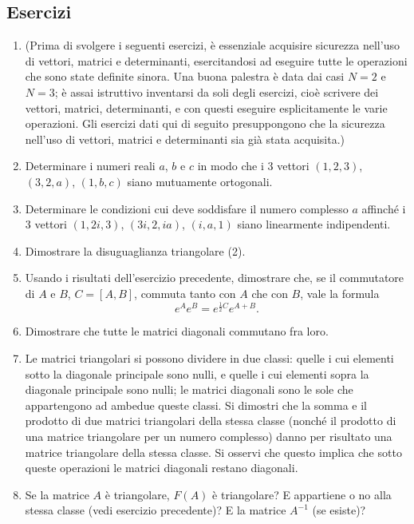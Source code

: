 \documentclass[11pt, a4paper]{book}
\numberwithin{equation}{section}
\newenvironment{esercizi}{\subsection*{Esercizi}\begin{enumerate}}{\end{enumerate}}
\begin{document}
\begin{esercizi}

\item[] (Prima di svolgere i seguenti esercizi, è essenziale acquisire sicurezza nell'uso di vettori, matrici e determinanti, esercitandosi ad eseguire tutte le operazioni che sono state definite sinora. Una buona palestra è data dai casi $N=2$ e $N=3$; è assai istruttivo inventarsi da soli degli esercizi, cioè scrivere dei vettori, matrici, determinanti, e con questi eseguire esplicitamente le varie operazioni. Gli esercizi dati qui di seguito presuppongono che la sicurezza nell'uso di vettori, matrici e determinanti sia già stata acquisita.)

\item Determinare i numeri reali $a$, $b$ e $c$ in modo che i 3 vettori $(1,2,3)$, $(3,2,a)$, $(1,b,c)$ siano mutuamente ortogonali.

\item Determinare le condizioni cui deve soddisfare il numero complesso $a$ affinché i 3 vettori $(1, 2i, 3)$, $(3i, 2, ia)$, $(i, a, 1)$ siano linearmente indipendenti.

\item Dimostrare la disuguaglianza triangolare (2).



\item[*] Usando i risultati dell'esercizio precedente, dimostrare che, se
il commutatore di $A$ e $B$, $C = [A,B]$, commuta tanto con $A$ che con
$B$, vale la formula
\[
e^{A} e^{B} = e^{\frac{1}{2}C} e^{A+B}.
\]

\item Dimostrare che tutte le matrici diagonali commutano fra loro.

\item Le matrici triangolari si possono dividere in due classi: quelle i
cui elementi sotto la diagonale principale sono nulli, e quelle i cui
elementi sopra la diagonale principale sono nulli; le matrici diagonali
sono le sole che appartengono ad ambedue queste classi. Si dimostri che la
somma e il prodotto di due matrici triangolari della stessa classe (nonché
il prodotto di una matrice triangolare per un numero complesso) danno per
risultato una matrice triangolare della stessa classe. Si osservi che
questo implica che sotto queste operazioni le matrici diagonali restano
diagonali.

\item Se la matrice $A$ è triangolare, $F(A)$ è triangolare? E appartiene
o no alla stessa classe (vedi esercizio precedente)? E la matrice $A^{-1}$
(se esiste)?


\end{esercizi}
\end{document}
